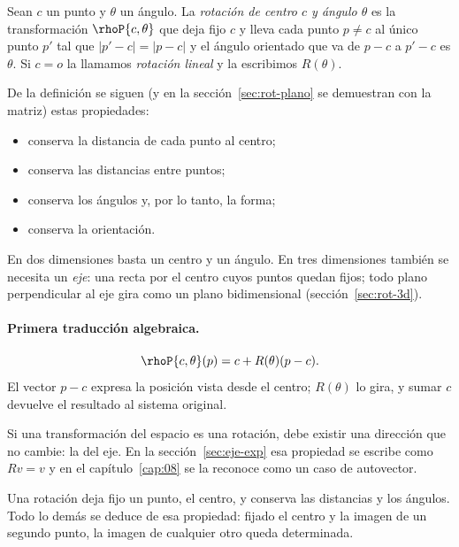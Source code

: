 \begin{definicion}
Sean \(c\) un punto y \(\theta\) un ángulo. La \emph{rotación de centro \(c\) y ángulo
\(\theta\)} es la transformación \(\rhoP{c,\theta}\) que deja fijo \(c\) y lleva cada punto
\(p\neq c\) al único punto \(p'\) tal que \(|p'-c|=|p-c|\) y el ángulo orientado que va de
\(p-c\) a \(p'-c\) es \(\theta\). Si \(c=o\) la llamamos \emph{rotación lineal} y la
escribimos \(R(\theta)\).
\end{definicion}

De la definición se siguen (y en la sección~\ref{sec:rot-plano} se demuestran con la matriz)
estas propiedades:
\begin{itemize}
  \item conserva la distancia de cada punto al centro;
  \item conserva las distancias entre puntos;
  \item conserva los ángulos y, por lo tanto, la forma;
  \item conserva la orientación.
\end{itemize}

En dos dimensiones basta un centro y un ángulo. En tres dimensiones también se necesita un
\emph{eje}: una recta por el centro cuyos puntos quedan fijos; todo plano perpendicular al eje
gira como un plano bidimensional (sección~\ref{sec:rot-3d}).

\paragraph{Primera traducción algebraica.}
\[
  \rhoP{c,\theta}(p)=c+R(\theta)(p-c).
\]
El vector \(p-c\) expresa la posición vista desde el centro; \(R(\theta)\) lo gira, y sumar
\(c\) devuelve el resultado al sistema original.

\begin{resultado}
Si una transformación del espacio es una rotación, debe existir una dirección que no cambie:
la del eje. En la sección~\ref{sec:eje-exp} esa propiedad se escribe como \(Rv=v\) y en el
capítulo~\ref{cap:08} se la reconoce como un caso de autovector.
\end{resultado}

\begin{idea}[Idea]
Una rotación deja fijo un punto, el centro, y conserva las distancias y los ángulos. Todo lo
demás se deduce de esa propiedad: fijado el centro y la imagen de un segundo punto, la imagen
de cualquier otro queda determinada.
\end{idea}


